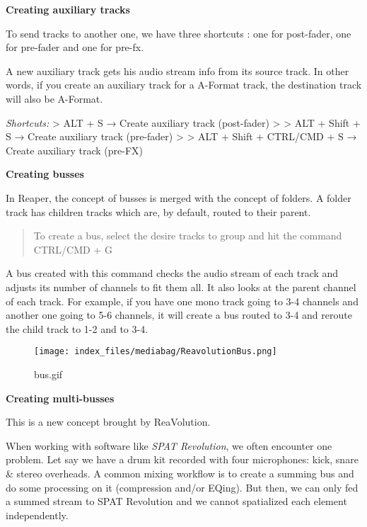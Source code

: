 \documentclass[
  letterpaper,
  DIV=11,
  numbers=noendperiod]{scrreport}
\begin{document}
\textbf{Creating auxiliary tracks}

To send tracks to another one, we have three shortcuts : one for
post-fader, one for pre-fader and one for pre-fx.

A new auxiliary track gets his audio stream info from its source track.
In other words, if you create an auxiliary track for a A-Format track,
the destination track will also be A-Format.

\emph{Shortcuts:} \textgreater{} ALT + S → Create auxiliary track
(post-fader) \textgreater{} \textgreater{} ALT + Shift + S → Create
auxiliary track (pre-fader) \textgreater{} \textgreater{} ALT + Shift +
CTRL/CMD + S → Create auxiliary track (pre-FX)

\textbf{Creating busses}

In Reaper, the concept of busses is merged with the concept of folders.
A folder track has children tracks which are, by default, routed to
their parent.

\begin{quote}
To create a bus, select the desire tracks to group and hit the command
CTRL/CMD + G
\end{quote}

A bus created with this command checks the audio stream of each track
and adjusts its number of channels to fit them all. It also looks at the
parent channel of each track. For example, if you have one mono track
going to 3-4 channels and another one going to 5-6 channels, it will
create a bus routed to 3-4 and reroute the child track to 1-2 and to
3-4.

\begin{figure}

{\centering \texttt{[image: index\_files/mediabag/ReavolutionBus.png]}

}

\caption{bus.gif}

\end{figure}

\textbf{Creating multi-busses}

This is a new concept brought by ReaVolution.

When working with software like \emph{SPAT Revolution}, we often
encounter one problem. Let say we have a drum kit recorded with four
microphones: kick, snare \& stereo overheads. A common mixing workflow
is to create a summing bus and do some processing on it (compression
and/or EQing). But then, we can only fed a summed stream to SPAT
Revolution and we cannot spatialized each element independently.
\end{document}
